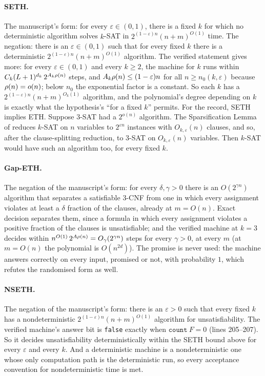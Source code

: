 \paragraph{SETH.} The manuscript's form: for every
$\varepsilon \in (0,1)$, there is a fixed $k$ for which no deterministic
algorithm solves $k$-SAT in $2^{(1-\varepsilon)n}(n+m)^{O(1)}$ time. The
negation: there is an $\varepsilon \in (0,1)$ such that for every fixed
$k$ there is a deterministic $2^{(1-\varepsilon)n}(n+m)^{O(1)}$
algorithm. The verified statement gives more: for every
$\varepsilon \in (0,1)$ and every $k \ge 2$, the machine for $k$ runs
within $C_k(L+1)^{d_k}\,2^{A_k\rho(n)}$ steps, and
$A_k\rho(n) \le (1-\varepsilon)n$ for all $n \ge n_0(k, \varepsilon)$
because $\rho(n) = o(n)$; below $n_0$ the exponential factor is a
constant. So each $k$ has a $2^{(1-\varepsilon)n}(n+m)^{O_k(1)}$
algorithm, and the polynomial's degree depending on $k$ is exactly what
the hypothesis's ``for a fixed $k$'' permits. For the record, SETH
implies ETH. Suppose 3-SAT had a $2^{o(n)}$ algorithm. The
Sparsification Lemma of \citet{ImpagliazzoPaturiZane2001} reduces
$k$-SAT on $n$ variables to $2^{\varepsilon n}$ instances with
$O_{k,\varepsilon}(n)$ clauses, and so, after the clause-splitting
reduction, to 3-SAT on $O_{k,\varepsilon}(n)$ variables. Then
$k$-SAT would have such an algorithm too, for every fixed $k$.

\paragraph{Gap-ETH.} The negation of the manuscript's form: for every
$\delta, \gamma > 0$ there is an $O(2^{\gamma n})$ algorithm that
separates a satisfiable 3-CNF from one in which every assignment
violates at least a $\delta$ fraction of the clauses, already at
$m = O(n)$. Exact decision separates them, since a formula in which
every assignment violates a positive fraction of the clauses is
unsatisfiable; and the verified machine at $k = 3$ decides within
$n^{O(1)}\,2^{A\rho(n)} = O_{\gamma}(2^{\gamma n})$ steps for every
$\gamma > 0$, at every $m$ (at $m = O(n)$ the polynomial is
$O(n^{2d})$). The promise is never used: the machine answers correctly
on every input, promised or not, with probability $1$, which refutes
the randomised form as well.

\paragraph{NSETH.} The negation of the manuscript's form: there is an
$\varepsilon > 0$ such that every fixed $k$ has a nondeterministic
$2^{(1-\varepsilon)n}(n+m)^{O(1)}$ algorithm for unsatisfiability. The
verified machine's answer bit is \texttt{false} exactly when
$\mathtt{count}\ F = 0$ (lines 205--207). So it decides unsatisfiability
deterministically within the SETH bound above for every $\varepsilon$
and every $k$. And a deterministic machine is a nondeterministic one
whose only computation path is the deterministic run, so every
acceptance convention for nondeterministic time is met.

